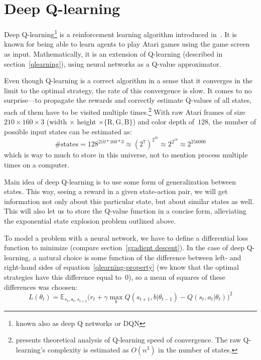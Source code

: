 \chapter{Deep Q-learning}\label{dqn}
Deep Q-learning\footnote{known also as deep Q networks or DQN} is a reinforcement learning algorithm introduced in~\cite{nips-dqn}. It is known for being able to learn agents to play Atari games using the game screen as input. Mathematically, it is an extension of Q-learning (described in section~\ref{qlearning}), using neural networks as a Q-value approximator.

Even though Q-learning is a correct algorithm in a sense that it converges in the limit to the optimal strategy, the rate of this convergence is slow. It comes to no surprise---to propagate the rewards and correctly estimate Q-values of all states, each of them have to be visited multiple times.\footnote{\cite{qlearning-complexity} presents theoretical analysis of Q-learning speed of convergence. The raw Q-learning's complexity is estimated as $O(n^3)$ in the number of states.}
With raw Atari frames of size~$210 \times 160 \times 3$ (width $\times$ height $\times \{\text{R}, \text{G}, \text{B}\}$) and color depth of~$128$, the number of possible input states can be estimated as:
\begin{equation}
  \mbox{\# states} = 128^{210*160*3} \approx (2^7)^{2^{16}} \approx 2^{2^{18}} \approx 2^{256000}
\end{equation}\label{number-frame-states}
which is way to much to store in this universe, not to mention process multiple times on a computer.

Main idea of deep Q-learning is to use some form of generalization between states. This way, seeing a reward in a given state-action pair, we will get information not only about this particular state, but about similar states as well. This will also let us to store the Q-value function in a concise form, alleviating the exponential state explosion problem outlined above.

To model a problem with a neural network, we have to define a differential loss function to minimize (compare section~\ref{gradient descent}). In the case of deep Q-learning, a natural choice is some function of the difference between left- and right-hand sides of equation~\eqref{qlearning-property} (we know that the optimal strategies have this difference equal to~$0$), so a mean of squares of these differences was choosen:
\begin{equation}\label{dqn-loss}
  L(\theta_t) = \mathbb{E}_{s_t, a_t, s_{t+1}} \big(r_t + \gamma \max_b Q(s_{t+1}, b|\theta_{t-1}) - Q(s_t, a_t|\theta_t)\big)^2
\end{equation}

